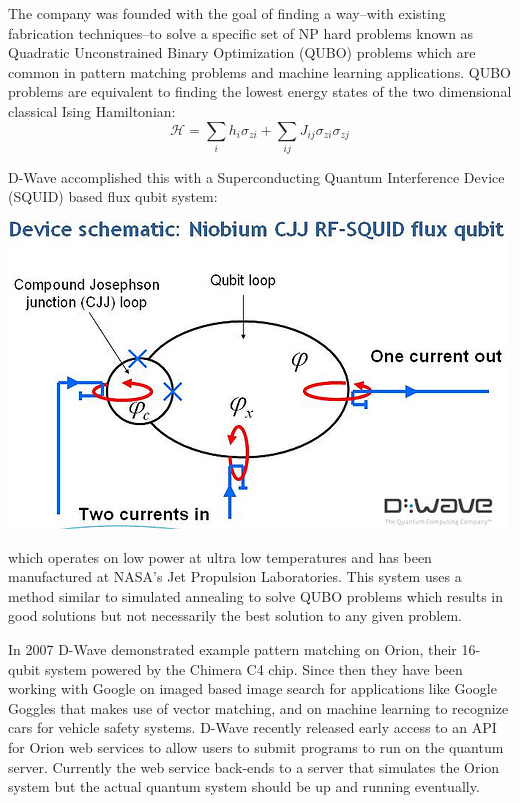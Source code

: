\documentclass[10pt]{article}
\begin{document}
The company was founded with the goal of finding a way--with existing fabrication techniques--to solve a specific set of NP hard problems known as Quadratic Unconstrained Binary Optimization (QUBO) problems which are common in pattern matching problems and machine learning applications.  QUBO problems are equivalent to finding the lowest energy states of the two dimensional classical Ising Hamiltonian: 
  \[\mathcal{H} = \displaystyle\sum\limits_{i}h_i\sigma_{zi} + \displaystyle\sum\limits_{ij}J_{ij}\sigma_{zi}\sigma_{zj}\]

D-Wave accomplished this with a Superconducting Quantum Interference Device (SQUID) based flux qubit system:
 \begin{center}
  \includegraphics[scale=.7]{../img/Qubit_Schematic}
 \end{center}
which operates on low power at ultra low temperatures and has been manufactured at NASA's Jet Propulsion Laboratories.  This system uses a method similar to simulated annealing to solve QUBO problems which results in good solutions but not necessarily the best solution to any given problem. 

In 2007 D-Wave demonstrated example pattern matching on Orion, their 16-qubit system powered by the Chimera C4 chip.  Since then they have been working with Google on imaged based image search for applications like Google Goggles that makes use of vector matching, and on machine learning to recognize cars for vehicle safety systems.  D-Wave recently released early access to an API for Orion web services to allow users to submit programs to run on the quantum server.  Currently the web service back-ends to a server that simulates the Orion system but the actual quantum system should be up and running eventually.
\end{document}
